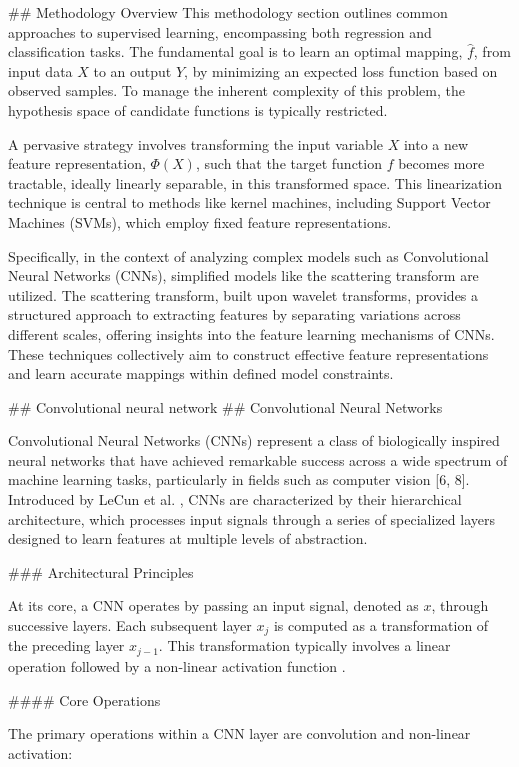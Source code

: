 \documentclass{article}
\begin{document}
\#\# Methodology Overview
This methodology section outlines common approaches to supervised learning, encompassing both regression and classification tasks. The fundamental goal is to learn an optimal mapping, $\hat{f}$, from input data $X$ to an output $Y$, by minimizing an expected loss function based on observed samples. To manage the inherent complexity of this problem, the hypothesis space of candidate functions is typically restricted.

A pervasive strategy involves transforming the input variable $X$ into a new feature representation, $\Phi(X)$, such that the target function $f$ becomes more tractable, ideally linearly separable, in this transformed space. This linearization technique is central to methods like kernel machines, including Support Vector Machines (SVMs), which employ fixed feature representations.

Specifically, in the context of analyzing complex models such as Convolutional Neural Networks (CNNs), simplified models like the scattering transform are utilized. The scattering transform, built upon wavelet transforms, provides a structured approach to extracting features by separating variations across different scales, offering insights into the feature learning mechanisms of CNNs. These techniques collectively aim to construct effective feature representations and learn accurate mappings within defined model constraints.

\#\# Convolutional neural network
\#\# Convolutional Neural Networks

Convolutional Neural Networks (CNNs) represent a class of biologically inspired neural networks that have achieved remarkable success across a wide spectrum of machine learning tasks, particularly in fields such as computer vision [6, 8]. Introduced by LeCun et al. \cite{6}, CNNs are characterized by their hierarchical architecture, which processes input signals through a series of specialized layers designed to learn features at multiple levels of abstraction.

\#\#\# Architectural Principles

At its core, a CNN operates by passing an input signal, denoted as $x$, through successive layers. Each subsequent layer $x_j$ is computed as a transformation of the preceding layer $x_{j-1}$. This transformation typically involves a linear operation followed by a non-linear activation function \cite{6}.

\#\#\#\# Core Operations

The primary operations within a CNN layer are convolution and non-linear activation:
\end{document}
